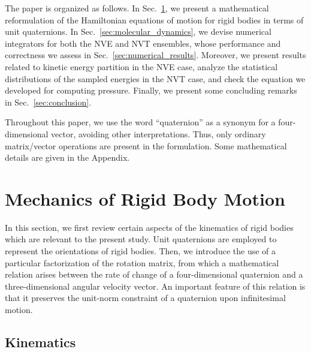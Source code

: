\documentclass[aip,jcp,reprint,amsmath,amssymb]{revtex4-1}
\begin{document}
The paper is organized as follows. In Sec.~\ref{sec:mechanics}, we present a mathematical reformulation of the Hamiltonian equations of motion for rigid bodies in terms of unit quaternions. In Sec.~\ref{sec:molecular_dynamics}, we devise numerical integrators for both the NVE and NVT ensembles, whose performance and correctness we assess in Sec.~\ref{sec:numerical_results}. Moreover, we present results related to kinetic energy partition in the NVE case, analyze the statistical distributions of the sampled energies in the NVT case, and check the equation we developed for computing pressure. Finally, we present some concluding remarks in Sec.~\ref{sec:conclusion}.

Throughout this paper, we use the word ``quaternion'' as a synonym for a four-dimensional vector, avoiding other interpretations. Thus, only ordinary matrix/vector operations are present in the formulation. Some mathematical details are given in the Appendix.

\section{Mechanics of Rigid Body Motion}
\label{sec:mechanics}

In this section, we first review certain aspects of the kinematics of rigid bodies which are relevant to the present study. Unit quaternions are employed to represent the orientations of rigid bodies. Then, we introduce the use of a particular factorization of the rotation matrix, from which a mathematical relation arises between the rate of change of a four-dimensional quaternion and a three-dimensional angular velocity vector. An important feature of this relation is that it preserves the unit-norm constraint of a quaternion upon infinitesimal motion.

\subsection{Kinematics}
\label{sec:kinematics}
\end{document}
